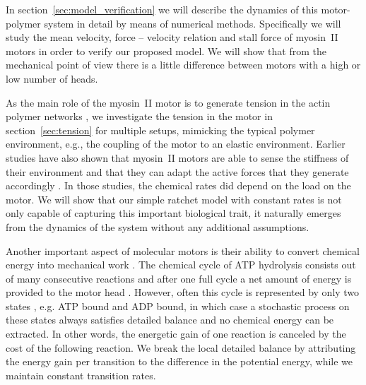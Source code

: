 \documentclass[aps,pre,twocolumn,showpacs,showkeys,superscriptaddress,floatfix]{revtex4-1}
\begin{document}
In section~\ref{sec:model_verification} we will describe the dynamics of this motor-polymer system in detail by means of numerical methods.
Specifically we will study the mean velocity, force -- velocity relation and stall force of myosin~II motors in order to verify our proposed model. 
We will show that from the mechanical point of view there is a little difference between motors with a high or low number of heads. 

As the main role of the myosin~II motor is to generate tension in the actin polymer networks \cite{ma2012nonmuscle,chugh2017actin,monier2010actomyosin}, 
we investigate the tension in the motor in section~\ref{sec:tension} for multiple setups, 
mimicking the typical polymer environment, 
e.g., the coupling of the motor to an elastic environment.
Earlier studies have also shown that myosin~II motors are able to sense the stiffness of their environment and that they can adapt the active forces that they generate accordingly \cite{stam2015isoforms,Albert2014}.
In those studies, the chemical rates did depend on the load on the motor. 
We will show that our simple ratchet model with constant rates is not only capable of capturing this important biological trait, it naturally emerges from the dynamics of the system without any additional assumptions.

Another important aspect of molecular motors is their ability to convert chemical energy into mechanical work \cite{astumian1996mechanochemical}.
The chemical cycle of ATP hydrolysis consists out of many consecutive reactions and after one full cycle a net amount of energy is provided to the motor head \cite{gajewski1986thermodynamics}.
However, often this cycle is represented by only two states \cite{julicher1997modeling,Reimann2002introduction}, e.g. ATP bound and ADP bound, 
in which case a stochastic process on these states always satisfies detailed balance and no chemical energy can be extracted. 
In other words, the energetic gain of one reaction is canceled by the cost of the following reaction.
We break the local detailed balance by attributing the energy gain per transition to the difference in the potential energy, while we maintain constant transition rates. 
\end{document}
